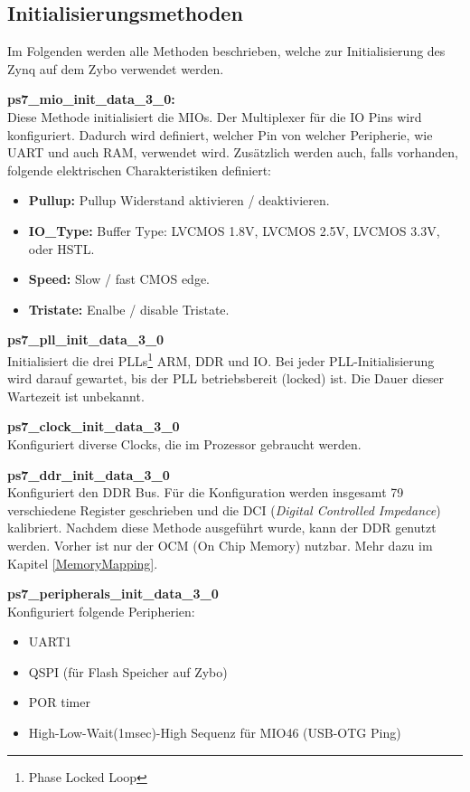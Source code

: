 

\subsection{Initialisierungsmethoden}
\label{Initialisierungsmethoden}
Im Folgenden werden alle Methoden beschrieben, welche zur Initialisierung des Zynq auf dem Zybo verwendet werden.

\textbf{ps7\_mio\_init\_data\_3\_0:}\\
Diese Methode initialisiert die MIOs.
Der Multiplexer für die IO Pins wird konfiguriert.
Dadurch wird definiert, welcher Pin von welcher Peripherie, wie UART und auch RAM, verwendet wird.
Zusätzlich werden auch, falls vorhanden, folgende elektrischen Charakteristiken definiert:
\begin{itemize}
\item \textbf{Pullup:} Pullup Widerstand aktivieren / deaktivieren.
\item \textbf{IO\_Type:} Buffer Type: LVCMOS 1.8V, LVCMOS 2.5V, LVCMOS 3.3V,  oder HSTL.
\item \textbf{Speed:} Slow / fast CMOS edge.
\item \textbf{Tristate:} Enalbe / disable Tristate.
\end{itemize} 


\textbf{ps7\_pll\_init\_data\_3\_0}\\
Initialisiert die drei PLLs\footnote{Phase Locked Loop} ARM, DDR und IO.
Bei jeder PLL-Initialisierung wird darauf gewartet, bis der PLL betriebsbereit (locked) ist.
Die Dauer dieser Wartezeit ist unbekannt.

\textbf{ps7\_clock\_init\_data\_3\_0}\\
Konfiguriert diverse Clocks, die im Prozessor gebraucht werden.

\textbf{ps7\_ddr\_init\_data\_3\_0}\\
Konfiguriert den DDR Bus.
Für die Konfiguration werden insgesamt 79 verschiedene Register geschrieben und die DCI (\textit{Digital Controlled Impedance}) kalibriert.
Nachdem diese Methode ausgeführt wurde, kann der DDR genutzt werden.
Vorher ist nur der OCM (On Chip Memory) nutzbar.
Mehr dazu im Kapitel \ref{MemoryMapping}.

\textbf{ps7\_peripherals\_init\_data\_3\_0}\\
Konfiguriert folgende Peripherien:
\begin{itemize}
\item UART1
\item QSPI (für Flash Speicher auf Zybo)
\item POR timer
\item High-Low-Wait(1msec)-High Sequenz für MIO46 (USB-OTG Ping)
\end{itemize}  




